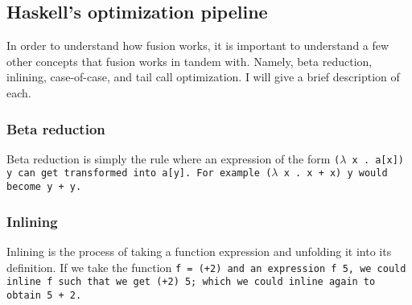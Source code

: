 \subsection{Haskell's optimization pipeline}
In order to understand how fusion works, it is important to understand a few other concepts that fusion works in tandem with.
Namely, beta reduction, inlining, case-of-case, and tail call optimization.
I will give a brief description of each.

\subsubsection{Beta reduction}
Beta reduction is simply the rule where an expression of the form \tt{($\lambda$ x . a[x]) y} can get transformed into \tt{a[y]}.
For example \tt{($\lambda$ x . x + x) y} would become \tt{y + y}.
\subsubsection{Inlining}
Inlining is the process of taking a function expression and unfolding it into its definition.
If we take the function \tt{f = (+2)} and an expression \tt{f 5}, we could inline \tt{f} such that we get \tt{(+2) 5}; which we could inline again to obtain \tt{5 + 2}.
